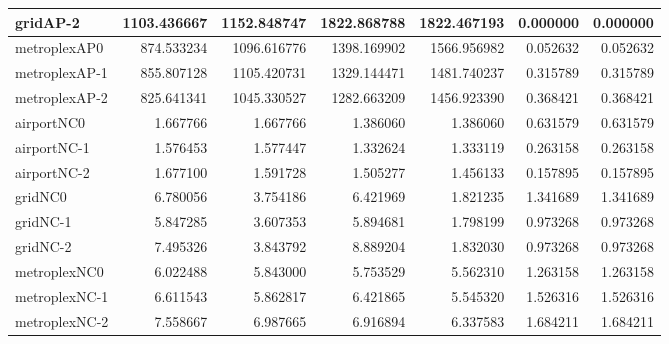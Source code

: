 \begin{longtable}{|l|r|r|r|r|r|r|}
gridAP-2 & 1103.436667 & 1152.848747 & 1822.868788 & 1822.467193 & 0.000000 & 0.000000 \\ \hline
metroplexAP0 & 874.533234 & 1096.616776 & 1398.169902 & 1566.956982 & 0.052632 & 0.052632 \\ \hline
metroplexAP-1 & 855.807128 & 1105.420731 & 1329.144471 & 1481.740237 & 0.315789 & 0.315789 \\ \hline
metroplexAP-2 & 825.641341 & 1045.330527 & 1282.663209 & 1456.923390 & 0.368421 & 0.368421 \\ \hline
airportNC0 & 1.667766 & 1.667766 & 1.386060 & 1.386060 & 0.631579 & 0.631579 \\ \hline
airportNC-1 & 1.576453 & 1.577447 & 1.332624 & 1.333119 & 0.263158 & 0.263158 \\ \hline
airportNC-2 & 1.677100 & 1.591728 & 1.505277 & 1.456133 & 0.157895 & 0.157895 \\ \hline
gridNC0 & 6.780056 & 3.754186 & 6.421969 & 1.821235 & 1.341689 & 1.341689 \\ \hline
gridNC-1 & 5.847285 & 3.607353 & 5.894681 & 1.798199 & 0.973268 & 0.973268 \\ \hline
gridNC-2 & 7.495326 & 3.843792 & 8.889204 & 1.832030 & 0.973268 & 0.973268 \\ \hline
metroplexNC0 & 6.022488 & 5.843000 & 5.753529 & 5.562310 & 1.263158 & 1.263158 \\ \hline
metroplexNC-1 & 6.611543 & 5.862817 & 6.421865 & 5.545320 & 1.526316 & 1.526316 \\ \hline
metroplexNC-2 & 7.558667 & 6.987665 & 6.916894 & 6.337583 & 1.684211 & 1.684211 \\ \hline
\end{longtable}

